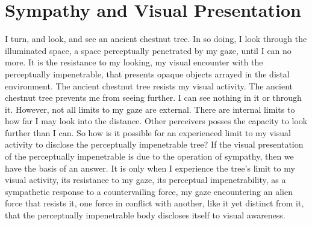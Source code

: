 \documentclass[12pt]{article}
\begin{document}

\section{Sympathy and Visual Presentation} %
\label{sec:sympathy_and_visual_presentation}

I turn, and look, and see an ancient chestnut tree. In so doing, I look through the illuminated space, a space perceptually penetrated by my gaze, until I can no more. It is the resistance to my looking, my visual encounter with the perceptually impenetrable, that presents opaque objects arrayed in the distal environment. The ancient chestnut tree resists my visual activity. The ancient chestnut tree prevents me from seeing further. I can see nothing in it or through it. However, not all limits to my gaze are external. There are internal limits to how far I may look into the distance. Other perceivers posses the capacity to look further than I can. So how is it possible for an experienced limit to my visual activity to disclose the perceptually impenetrable tree? If the visual presentation of the perceptually impenetrable is due to the operation of sympathy, then we have the basis of an answer. It is only when I experience the tree's limit to my visual activity, its resistance to my gaze, its perceptual impenetrability, as a sympathetic response to a countervailing force, my gaze encountering an alien force that resists it, one force in conflict with another, like it yet distinct from it, that the perceptually impenetrable body discloses itself to visual awareness.

\end{document}
